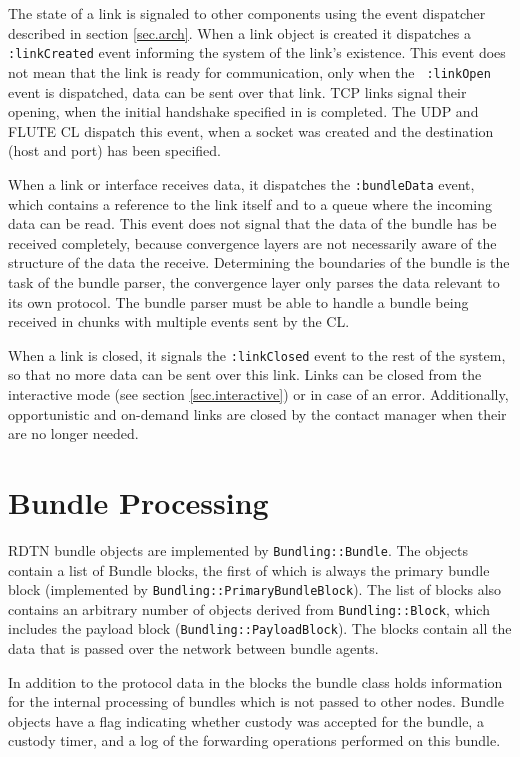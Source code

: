 \documentclass{article}
\begin{document}
The state of a link is signaled to other components using the event dispatcher
described in section \ref{sec.arch}. When a link object is created it dispatches
a {\tt :linkCreated} event informing the system of the link's existence. This
event does not mean that the link is ready for communication, only when the {\tt
:linkOpen} event is dispatched, data can be sent over that link. TCP links
signal their opening, when the initial handshake specified in \cite{dtn-tcp-cl} is
completed. The UDP and FLUTE CL dispatch this event, when a socket was created
and the destination (host and port) has been specified.

When a link or interface receives data, it dispatches the {\tt :bundleData}
event, which contains a reference to the link itself and to a queue where the
incoming data can be read. This event does not signal that the data of the
bundle has be received completely, because convergence layers are not
necessarily aware of the structure of the data the receive. Determining the
boundaries of the bundle is the task of the bundle parser, the convergence layer
only parses the data relevant to its own protocol. The bundle parser must be
able to handle a bundle being received in chunks with multiple events sent by
the CL.

When a link is closed, it signals the {\tt :linkClosed} event to the rest of the
system, so that no more data can be sent over this link. Links can be closed
from the interactive mode (see section \ref{sec.interactive}) or in case of an
error. Additionally, opportunistic and on-demand links are closed by the contact
manager when their are no longer needed.

\section{Bundle Processing}\label{sec.bundle-proc}

RDTN bundle objects are implemented by {\tt Bundling::Bundle}. The objects
contain a list of Bundle blocks, the first of which is always the primary bundle
block (implemented by {\tt Bundling::PrimaryBundleBlock}). The list of blocks
also contains an arbitrary number of objects derived from {\tt Bundling::Block},
which includes the payload block ({\tt Bundling::PayloadBlock}). The blocks
contain all the data that is passed over the network between bundle agents. 

In addition to the protocol data in the blocks the bundle class holds
information for the internal processing of bundles which is not passed to other
nodes.  Bundle objects have a flag indicating whether custody was accepted for
the bundle, a custody timer, and a log of the forwarding operations performed on
this bundle.
\end{document}
